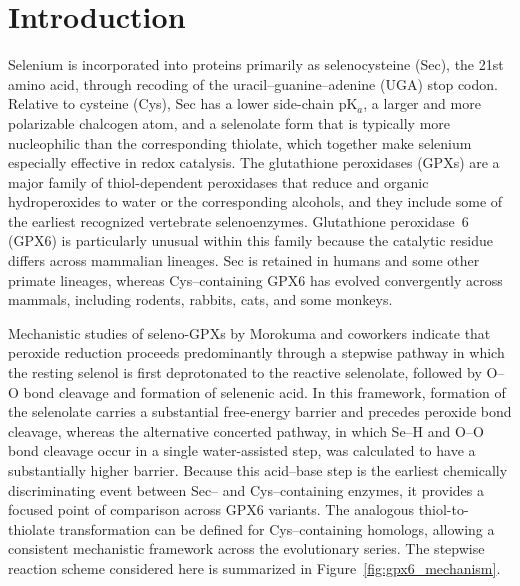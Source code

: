 \section{Introduction}

Selenium is incorporated into proteins primarily as selenocysteine (Sec), the 21st amino acid, through recoding of the uracil--guanine--adenine (UGA) stop codon.\cite{Berry1991UGA,Kryukov2003Selenoproteomes,Shetty2015Selenocysteine,hondal_selenium_2011,Labunskyy2014} Relative to cysteine (Cys), Sec has a lower side-chain pK$_a$, a larger and more polarizable chalcogen atom, and a selenolate form that is typically more nucleophilic than the corresponding thiolate, which together make selenium especially effective in redox catalysis.\cite{johansson_selenocysteine_2005,hondal_selenium_2011,Arner2010,ChungKrahn2022SelenocysteineToolbox,Reich2016,Kanavos2026SecSelectivity} The glutathione peroxidases (GPXs) are a major family of thiol-dependent peroxidases that reduce  and organic hydroperoxides to water or the corresponding alcohols, and they include some of the earliest recognized vertebrate selenoenzymes.\cite{Rotruck1973,BrigeliusFlohe2013GlutathionePeroxidases,pei_research_2023} Glutathione peroxidase~6 (GPX6) is particularly unusual within this family because the catalytic residue differs across mammalian lineages. Sec is retained in humans and some other primate lineages, whereas Cys--containing GPX6 has evolved convergently across mammals, including rodents, rabbits, cats, and some monkeys.\cite{BrigeliusFlohe2013GlutathionePeroxidases,rees_ancient_2024}

Mechanistic studies of seleno-GPXs by Morokuma and coworkers\cite{prabhakar_elucidation_2005,prabhakar_is_2006} indicate that peroxide reduction proceeds predominantly through a stepwise pathway in which the resting selenol is first deprotonated to the reactive selenolate, followed by O--O bond cleavage and formation of selenenic acid. 
In this framework, formation of the selenolate carries a substantial free-energy barrier and precedes peroxide bond cleavage, whereas the alternative concerted pathway, in which Se--H and O--O bond cleavage occur in a single water-assisted step, was calculated to have a substantially higher barrier.\cite{prabhakar_elucidation_2005,prabhakar_is_2006}
Because this acid--base step is the earliest chemically discriminating event between Sec-- and Cys--containing enzymes, it provides a focused point of comparison across GPX6 variants.\cite{prabhakar_is_2006,cardey_selenocysteine_2007} The analogous thiol-to-thiolate transformation can be defined for Cys--containing homologs, allowing a consistent mechanistic framework across the evolutionary series.\cite{cardey_selenocysteine_2007}
The stepwise reaction scheme considered here is summarized in Figure~\ref{fig:gpx6_mechanism}.


